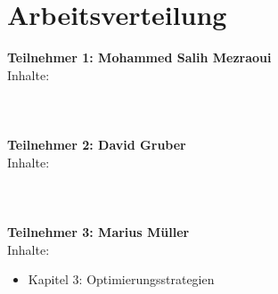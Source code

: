 \chapter*{Arbeitsverteilung}

\textbf{Teilnehmer 1: Mohammed Salih Mezraoui} 
\\
 Inhalte:
\\
\\
\\
\\
\textbf{Teilnehmer 2: David Gruber} 
\\
 Inhalte: 	
\\
\\
\\
\\
\textbf{Teilnehmer 3: Marius Müller} 
\\
 Inhalte: 
\begin{itemize}
	\item Kapitel 3: Optimierungsstrategien
\end{itemize}